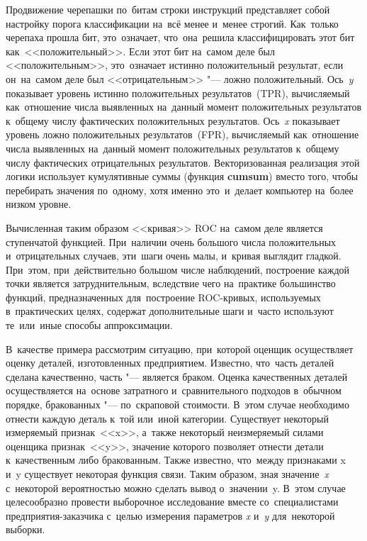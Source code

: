 \documentclass[]{scrreprt}
\begin{document}
Продвижение черепашки по~битам строки инструкций представляет собой настройку порога классификации на~всё менее и~менее строгий. Как~только черепаха прошла бит, это~означает, что~она~решила классифицировать этот бит как~<<положительный>>. Если этот бит на~самом деле был <<положительным>>, это~означает истинно положительный результат, если он~на~самом деле был <<отрицательным>> "--- ложно положительный. Ось~\emph{y} показывает уровень истинно положительных результатов~(TPR), вычисляемый как~отношение числа выявленных на~данный момент положительных результатов к~общему числу фактических положительных результатов. Ось~\emph{x} показывает уровень ложно положительных результатов~(FPR), вычисляемый как~отношение числа выявленных на~данный момент положительных результатов к~общему числу фактических отрицательных результатов. Векторизованная реализация этой логики использует кумулятивные суммы (функция \textbf{cumsum}) вместо того, чтобы перебирать значения по~одному, хотя именно это~и~делает компьютер на~более низком уровне.

Вычисленная таким образом <<кривая>> ROC на~самом деле является ступенчатой функцией. При~наличии очень большого числа положительных и~отрицательных случаев, эти~шаги очень малы, и~кривая выглядит гладкой. При~этом, при~действительно большом числе наблюдений, построение каждой точки является затруднительным, вследствие чего на~практике большинство функций, предназначенных для~построение ROC-кривых, используемых в~практических целях, содержат дополнительные шаги и~часто используют те~или~иные способы аппроксимации.

В~качестве примера рассмотрим ситуацию, при~которой оценщик осуществляет оценку деталей, изготовленных предприятием. Известно, что~часть деталей сделана качественно, часть "--- является браком. Оценка качественных деталей осуществляется на~основе затратного и~сравнительного подходов в~обычном порядке, бракованных "--- по~скраповой стоимости. В~этом случае необходимо отнести каждую деталь к~той или~иной категории. Существует некоторый измеряемый признак~<<x>>, а~также некоторый неизмеряемый силами оценщика признак~<<y>>, значение которого позволяет отнести детали к~качественным либо бракованным. Также известно, что~между признаками x и~y существует некоторая функция связи. Таким образом, зная значение~\emph{x} с~некоторой вероятностью можно сделать вывод о~значении~y. В~этом случае целесообразно провести выборочное исследование вместе со~специалистами предприятия-заказчика с~целью измерения параметров \emph{x} и~\emph{y} для~некоторой выборки.
\end{document}
